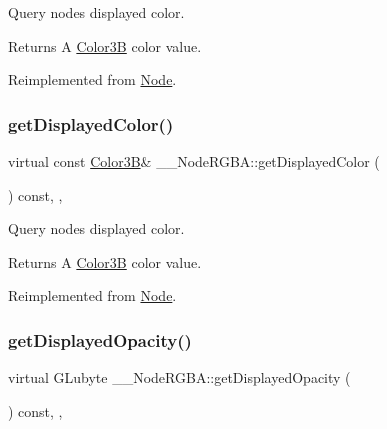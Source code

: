 Query node\textquotesingle{}s displayed color. \begin{DoxyReturn}{Returns}
A \hyperlink{structColor3B}{Color3B} color value. 
\end{DoxyReturn}


Reimplemented from \hyperlink{classNode_a899760bbad414bfbe9fb51473e99c3eb}{Node}.

\mbox{\label{class____NodeRGBA_ae17a9077b86673cb75f799cb4f6c8a1d}} 
\subsubsection{\texorpdfstring{get\+Displayed\+Color()}{getDisplayedColor()}\hspace{0.1cm}{\footnotesize\ttfamily [2/2]}}
{\footnotesize\ttfamily virtual const \hyperlink{structColor3B}{Color3B}\& \+\_\+\+\_\+\+Node\+R\+G\+B\+A\+::get\+Displayed\+Color (\begin{DoxyParamCaption}{ }\end{DoxyParamCaption}) const\hspace{0.3cm}{\ttfamily [inline]}, {\ttfamily [override]}, {\ttfamily [virtual]}}

Query node\textquotesingle{}s displayed color. \begin{DoxyReturn}{Returns}
A \hyperlink{structColor3B}{Color3B} color value. 
\end{DoxyReturn}


Reimplemented from \hyperlink{classNode_a899760bbad414bfbe9fb51473e99c3eb}{Node}.

\mbox{\label{class____NodeRGBA_adbf1aa17734836db2096f2901d81d304}} 
\subsubsection{\texorpdfstring{get\+Displayed\+Opacity()}{getDisplayedOpacity()}\hspace{0.1cm}{\footnotesize\ttfamily [1/2]}}
{\footnotesize\ttfamily virtual G\+Lubyte \+\_\+\+\_\+\+Node\+R\+G\+B\+A\+::get\+Displayed\+Opacity (\begin{DoxyParamCaption}{ }\end{DoxyParamCaption}) const\hspace{0.3cm}{\ttfamily [inline]}, {\ttfamily [override]}, {\ttfamily [virtual]}}

